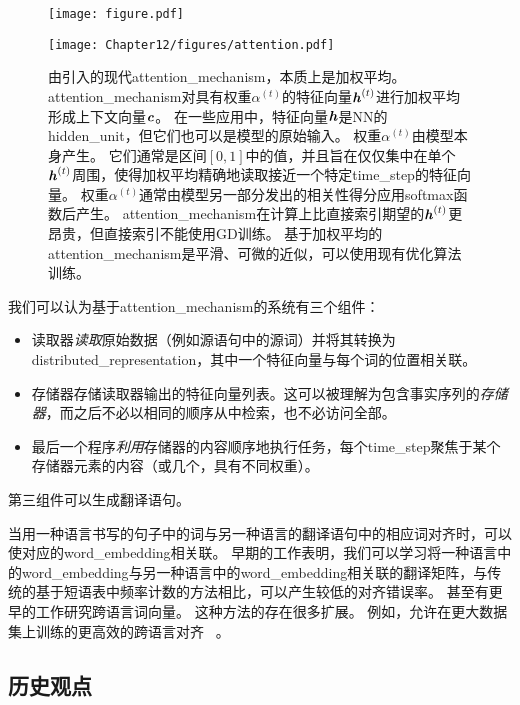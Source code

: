  \begin{figure}[htp]
\ifOpenSource
\centerline{\texttt{[image: figure.pdf]}}
\else
\centerline{\texttt{[image: Chapter12/figures/attention.pdf]}}
\fi
\caption{由\citet{Bahdanau-et-al-ICLR2015-small}引入的现代\gls{attention_mechanism}，本质上是加权平均。
\gls{attention_mechanism}对具有权重$\alpha^{(t)}$的特征向量$\boldsymbol{\mathit{h}}^{(t)}$进行加权平均形成上下文向量$\boldsymbol{\mathit{c}}$。
在一些应用中，特征向量$\boldsymbol{\mathit{h}}$是\gls{NN}的\gls{hidden_unit}，但它们也可以是模型的原始输入。
权重$\alpha^{(t)}$由模型本身产生。
它们通常是区间$[0,1]$中的值，并且旨在仅仅集中在单个$\boldsymbol{\mathit{h}}^{(t)}$周围，使得加权平均精确地读取接近一个特定\gls{time_step}的特征向量。
权重$\alpha^{(t)}$通常由模型另一部分发出的相关性得分应用softmax函数后产生。
\gls{attention_mechanism}在计算上比直接索引期望的$\boldsymbol{\mathit{h}}^{(t)}$更昂贵，但直接索引不能使用\gls{GD}训练。
基于加权平均的\gls{attention_mechanism}是平滑、可微的近似，可以使用现有优化算法训练。
}
\label{fig:chap12_attention}
\end{figure}

我们可以认为基于\gls{attention_mechanism}的系统有三个组件：
\begin{itemize}
 \item   读取器\emph{读取}原始数据（例如源语句中的源词）并将其转换为\gls{distributed_representation}，其中一个特征向量与每个词的位置相关联。
 \item 存储器存储读取器输出的特征向量列表。这可以被理解为包含事实序列的\emph{存储器}，而之后不必以相同的顺序从中检索，也不必访问全部。
 \item 最后一个程序\emph{利用}存储器的内容顺序地执行任务，每个\gls{time_step}聚焦于某个存储器元素的内容（或几个，具有不同权重）。
\end{itemize}
第三组件可以生成翻译语句。


当用一种语言书写的句子中的词与另一种语言的翻译语句中的相应词对齐时，可以使对应的\gls{word_embedding}相关联。
早期的工作表明，我们可以学习将一种语言中的\gls{word_embedding}与另一种语言中的\gls{word_embedding}相关联的翻译矩阵\citep{Kocisky-et-al-ACL2014}，与传统的基于短语表中频率计数的方法相比，可以产生较低的对齐错误率。
甚至有更早的工作\citep{Klementiev-et-al-COLING2012}研究跨语言词向量。 
这种方法的存在很多扩展。
例如，允许在更大数据集上训练的更高效的跨语言对齐~\citep{Gouws-et-al-arxiv2014} 。

\subsection{历史观点}
\label{sec:historical_perspective_chap12}

